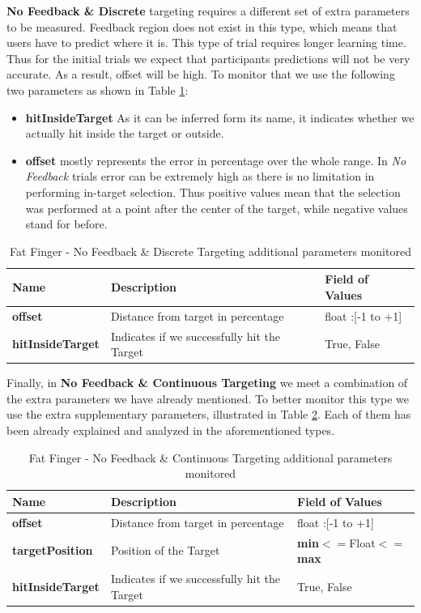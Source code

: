 \textbf{No Feedback \& Discrete} targeting requires a different set of extra parameters to be measured. Feedback region does not exist in this type, which means that users have to predict where it is. This type of trial requires longer learning time. Thus for the initial trials we expect that participants predictions will not be very accurate. As a result, offset will be high. To monitor that we use the following two parameters as shown in Table \ref{tab:ffNFDData}:
\begin{itemize}
	\item \textbf{hitInsideTarget} As it can be inferred form its name, it indicates whether we actually hit inside the target or outside. 
	\item \textbf{offset} mostly represents the error in percentage over the whole range. In \emph{No Feedback} trials error can be extremely high as there is no limitation in performing in-target selection. Thus positive values mean that the selection was performed at a point after the center of the target, while negative values stand for before.
\end{itemize}


\begin{table}[H]
\centering
\begin{tabular}{l || l || l}
Name & Description & Field of Values  \\
\hline \hline
\textbf{offset} & Distance from target in percentage & float :[-1 to +1] \\
\textbf{hitInsideTarget} & Indicates if we successfully hit the Target & True, False
\end{tabular}
\caption{Fat Finger - No Feedback \& Discrete Targeting additional parameters monitored}
\label{tab:ffNFDData}
\end{table}

Finally, in \textbf{No Feedback \& Continuous Targeting} we meet a combination of the extra parameters we have already mentioned. To better monitor this type we use the extra supplementary parameters, illustrated in Table \ref{tab:ffNFNDData}. Each of them has been already explained and analyzed in the aforementioned types.



\begin{table}[H]
\centering
\begin{tabular}{l || l || l}
Name & Description & Field of Values \\
\hline \hline
\textbf{offset} & Distance from target in percentage & float :[-1 to +1] \\
\textbf{targetPosition} & Position of the Target & \textbf{min}$<=$Float$<=$\textbf{max} \\
\textbf{hitInsideTarget} & Indicates if we successfully hit the Target & True, False
\end{tabular}
\caption{Fat Finger - No Feedback \& Continuous Targeting additional parameters monitored}
\label{tab:ffNFNDData}
\end{table}

